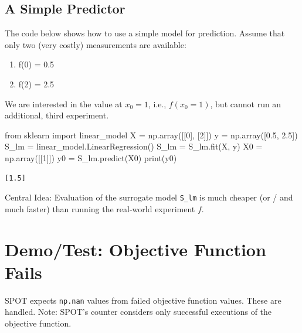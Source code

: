 \documentclass[
  letterpaper,
  DIV=11,
  numbers=noendperiod]{scrreprt}
\newenvironment{Shaded}{\begin{snugshade}}{\end{snugshade}}
\newcommand{\BuiltInTok}[1]{\textcolor[rgb]{0.00,0.23,0.31}{#1}}
\newcommand{\DecValTok}[1]{\textcolor[rgb]{0.68,0.00,0.00}{#1}}
\newcommand{\FloatTok}[1]{\textcolor[rgb]{0.68,0.00,0.00}{#1}}
\newcommand{\ImportTok}[1]{\textcolor[rgb]{0.00,0.46,0.62}{#1}}
\newcommand{\NormalTok}[1]{\textcolor[rgb]{0.00,0.23,0.31}{#1}}
\newcommand{\OperatorTok}[1]{\textcolor[rgb]{0.37,0.37,0.37}{#1}}
\providecommand{\tightlist}{%
  \setlength{\itemsep}{0pt}\setlength{\parskip}{0pt}}\usepackage{longtable,booktabs,array}
\begin{document}
\hypertarget{a-simple-predictor-1}{%
\subsection{A Simple Predictor}\label{a-simple-predictor-1}}

The code below shows how to use a simple model for prediction. Assume
that only two (very costly) measurements are available:

\begin{enumerate}
\def\labelenumi{\arabic{enumi}.}
\tightlist
\item
  f(0) = 0.5
\item
  f(2) = 2.5
\end{enumerate}

We are interested in the value at \(x_0 = 1\), i.e., \(f(x_0 = 1)\), but
cannot run an additional, third experiment.

\begin{Shaded}
\begin{Highlighting}[]
\ImportTok{from}\NormalTok{ sklearn }\ImportTok{import}\NormalTok{ linear\_model}
\NormalTok{X }\OperatorTok{=}\NormalTok{ np.array([[}\DecValTok{0}\NormalTok{], [}\DecValTok{2}\NormalTok{]])}
\NormalTok{y }\OperatorTok{=}\NormalTok{ np.array([}\FloatTok{0.5}\NormalTok{, }\FloatTok{2.5}\NormalTok{])}
\NormalTok{S\_lm }\OperatorTok{=}\NormalTok{ linear\_model.LinearRegression()}
\NormalTok{S\_lm }\OperatorTok{=}\NormalTok{ S\_lm.fit(X, y)}
\NormalTok{X0 }\OperatorTok{=}\NormalTok{ np.array([[}\DecValTok{1}\NormalTok{]])}
\NormalTok{y0 }\OperatorTok{=}\NormalTok{ S\_lm.predict(X0)}
\BuiltInTok{print}\NormalTok{(y0)}
\end{Highlighting}
\end{Shaded}

\begin{verbatim}
[1.5]
\end{verbatim}

Central Idea: Evaluation of the surrogate model \texttt{S\_lm} is much
cheaper (or / and much faster) than running the real-world experiment
\(f\).

\hypertarget{demotest-objective-function-fails}{%
\section{Demo/Test: Objective Function
Fails}\label{demotest-objective-function-fails}}

SPOT expects \texttt{np.nan} values from failed objective function
values. These are handled. Note: SPOT's counter considers only
successful executions of the objective function.
\end{document}
